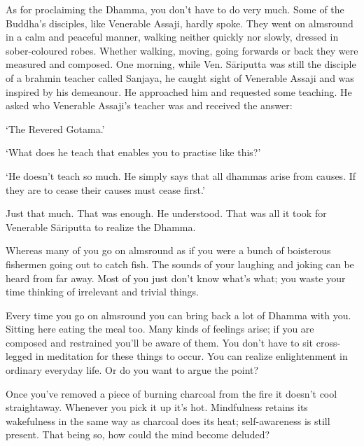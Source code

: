 As for proclaiming the Dhamma, you don't have to do very much. Some of the Buddha's disciples, like Venerable Assaji, hardly spoke. They went on almsround in a calm and peaceful manner, walking neither quickly nor slowly, dressed in sober-coloured robes. Whether walking, moving, going forwards or back they were measured and composed. One morning, while Ven. S\=ariputta was still the disciple of a brahmin teacher called Sanjaya, he caught sight of Venerable Assaji and was inspired by his demeanour. He approached him and requested some teaching. He asked who Venerable Assaji's teacher was and received the answer:

`The Revered Gotama.'

`What does he teach that enables you to practise like this?'

`He doesn't teach so much. He simply says that all dhammas arise from causes. If they are to cease their causes must cease first.'

Just that much. That was enough. He understood. That was all it took for Venerable S\=ariputta to realize the Dhamma.

Whereas many of you go on almsround as if you were a bunch of boisterous fishermen going out to catch fish. The sounds of your laughing and joking can be heard from far away. Most of you just don't know what's what; you waste your time thinking of irrelevant and trivial things.

Every time you go on almsround you can bring back a lot of Dhamma with you. Sitting here eating the meal too. Many kinds of feelings arise; if you are composed and restrained you'll be aware of them. You don't have to sit cross-legged in meditation for these things to occur. You can realize enlightenment in ordinary everyday life. Or do you want to argue the point?

Once you've removed a piece of burning charcoal from the fire it doesn't cool straightaway. Whenever you pick it up it's hot. Mindfulness retains its wakefulness in the same way as charcoal does its heat; self-awareness is still present. That being so, how could the mind become deluded?


